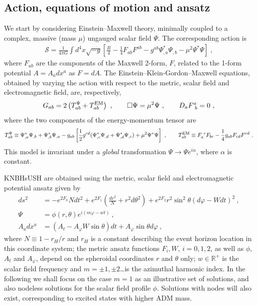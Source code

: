 \subsection{Action, equations of motion and ansatz}
\label{sec_mofrl}
We start by considering Einstein--Maxwell theory, minimally coupled to a complex, massive (mass $\mu$)  ungauged scalar field $\Psi$.  The corresponding action is
%
%
\begin{eqnarray}
  \label{action}
 \mathcal{S} = \frac{1}{4\pi G}\int d^4x \sqrt{-g}\left[\frac{R}{4}- \frac{1}{4}F_{ab}F^{ab}- g^{ab}\Psi^*_{,a}\Psi_{,b} -\mu^2\Psi^*\Psi \right]\ ,  
\end{eqnarray}  
where $F_{ab}$ are the components of the Maxwell 2-form, $F$, related to the 1-form potential $A=A_adx^a$ as $F=dA$. The Einstein--Klein-Gordon--Maxwell equations, obtained by varying the action with respect to the metric, scalar field and electromagnetic field, are, respectively,
%
%
\begin{equation}
G_{ab}  = 2\left( T_{ab}^\Psi+T_{ab} ^{\rm EM} \right)\ , \qquad \Box \Psi =\mu^2\Psi \ , \qquad D_aF^a_{~b}=0 \ ,
\label{eom}
\end{equation}
where the two components of the energy-momentum tensor are
%
\begin{equation}
\label{emt}
T_{ab}^\Psi \equiv  
 \Psi_{ , a}^*\Psi_{,b}
+\Psi_{,b}^*\Psi_{,a} 
-g_{ab}  \left[ \frac{1}{2} g^{cd} 
 ( \Psi_{,c}^*\Psi_{,d}+
\Psi_{,d}^*\Psi_{,c} )+\mu^2 \Psi^*\Psi\right] \ , \qquad
 T_{ab}^{\rm EM} \equiv F_a^{~c}F_{bc} - \frac{1}{4}g_{ab}F_{cd}F^{cd} \ .
\end{equation}
This model is invariant under a \textit{global} transformation $\Psi\rightarrow \Psi e^{i\alpha}$, where $\alpha$ is constant.



KNBHsUSH are obtained using the metric, scalar field and electromagnetic potential ansatz given by
%
\begin{align}
  \label{metric_ansatz}
  ds^2 &= -e^{2F_0}Ndt^2 + e^{2F_1}\left( \frac{dr^2}{N} + r^2d\theta^2 \right) + e^{2F_2}r^2\sin^2\theta \left(d\varphi - Wdt \right)^2 \ ,\\
\label{scalar_ansatz}
\Psi &= \phi(r,\theta)e^{i(m\varphi-w t)}~, \\
 \label{electric_ansatz}
 A_adx^a &= \left( A_t - A_\varphi W\sin\theta \right)dt + A_\varphi\sin\theta d\varphi \ ,
\end{align}
where $N\equiv 1-r_H/r$ and $r_H$ is a constant describing the event horizon location in this coordinate system; the metric ansatz functions $F_i,W$, $i=0,1,2$, as well as $\phi$, $A_t$ and $A_\varphi$, depend on the spheroidal coordinates $r$ and $\theta$ only; $w\in \mathbb{R}^+$ is the scalar field frequency and $m=\pm 1,\pm 2$\dots is the azimuthal harmonic index. In the following we shall focus on the case $m=1$ as an illustrative set of solutions, and also nodeless solutions for the scalar field profile $\phi$. Solutions with nodes will also exist, corresponding to excited states with higher ADM mass. 




